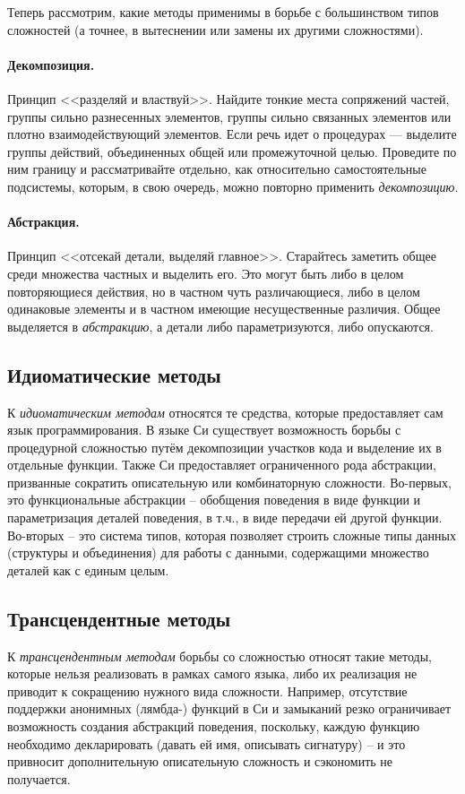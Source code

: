 \documentclass[10pt]{report}
\begin{document}
Теперь рассмотрим, какие методы применимы в борьбе с большинством типов сложностей (а точнее, в вытеснении или замены их другими сложностями).
\paragraph{Декомпозиция.} Принцип <<разделяй и властвуй>>. Найдите тонкие места сопряжений частей, группы сильно разнесенных элементов, группы сильно связанных элементов или плотно взаимодействующий элементов. Если речь идет о процедурах --- выделите группы действий, объединенных общей или промежуточной целью. Проведите по ним границу и рассматривайте отдельно, как относительно самостоятельные подсистемы, которым, в свою очередь, можно повторно применить {\em декомпозицию}.
\paragraph{Абстракция.} Принцип <<отсекай детали, выделяй главное>>. Старайтесь заметить общее среди множества частных и выделить его. Это могут быть либо в целом повторяющиеся действия, но в частном чуть различающиеся, либо в целом одинаковые элементы и в частном имеющие несущественные различия. Общее выделяется в {\em абстракцию}, а детали либо параметризуются, либо опускаются.
\subsection{Идиоматические методы}
К {\em идиоматическим методам} относятся те средства, которые предоставляет сам язык программирования. 
В языке Си существует возможность борьбы с процедурной сложностью путём декомпозиции участков кода и выделение их в отдельные функции.
Также Си предоставляет ограниченного рода абстракции, призванные сократить описательную или комбинаторную сложности. Во-первых, это функциональные абстракции -- обобщения поведения в виде функции и параметризация деталей поведения, в т.ч., в виде передачи ей другой функции.
Во-вторых -- это система типов, которая позволяет строить сложные типы данных (структуры и объединения) для работы с данными, содержащими множество деталей как с единым целым.
\subsection{Трансцендентные методы}
К {\em трансцендентным методам} борьбы со сложностью относят такие методы, которые нельзя реализовать в рамках самого языка, либо их реализация не приводит к сокращению нужного вида сложности. 
Например, отсутствие поддержки анонимных (лямбда-) функций в Си и замыканий резко ограничивает возможность создания абстракций поведения, поскольку, каждую функцию необходимо декларировать (давать ей имя, описывать сигнатуру) -- и это привносит дополнительную описательную сложность и сэкономить не получается.
\end{document}
